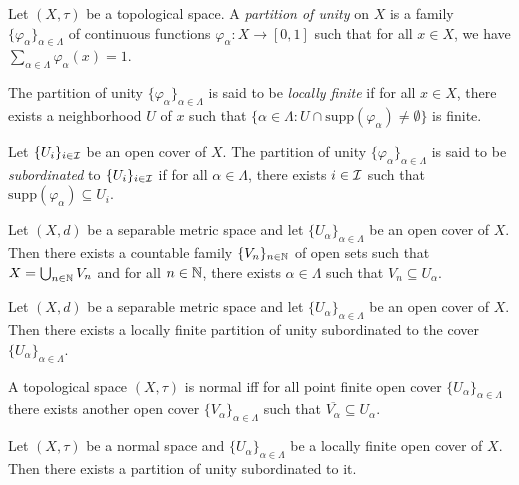 \documentclass[screen,single]{techreport}
\numberwithin{equation}{section}
\begin{document}
\begin{definition}\label{De:PartiOfUnity}
  Let $(X,\tau)$ be a topological space.
  A \emph{partition of unity} on $X$ is a family $\{ \varphi_\alpha \}_{\alpha \in \Lambda}$ of continuous functions $\varphi_\alpha : X \to [0,1]$ such that for all $x \in X$, we have $\sum_{\alpha \in \Lambda} \varphi_\alpha(x) = 1$.
  
  The partition of unity $\{ \varphi_\alpha\}_{\alpha \in \Lambda}$ is said to be \emph{locally finite} if for all $x \in X$, there exists a neighborhood $U$ of $x$ such that $\{ \alpha \in \Lambda : U \cap \mathrm{supp}(\varphi_\alpha) \neq \emptyset \}$ is finite.
  
  Let $\{U_i\}_{i \in \mathcal{I}}$ be an open cover of $X$.
  The partition of unity $\{ \varphi_{\alpha} \}_{\alpha \in \Lambda}$ is said to be \emph{subordinated} to $\{U_i\}_{i \in \mathcal{I}}$ if for all $\alpha \in \Lambda$, there exists $i \in \mathcal{I}$ such that $\mathrm{supp}(\varphi_\alpha) \subseteq U_i$.
\end{definition}

\begin{lemma}\label{Lem:SeparMetricImplyOpenCoverAdmitCountableRefine}
  Let $(X,d)$ be a separable metric space and let $\{U_\alpha\}_{\alpha \in \Lambda}$ be an open cover of $X$.
  Then there exists a countable family $\{V_n\}_{n \in \mathbb{N}}$ of open sets such that $X = \bigcup_{n \in \mathbb{N}} V_n$ and for all $n \in \mathbb{N}$, there exists $\alpha \in \Lambda$ such that $V_n \subseteq U_\alpha$.
\end{lemma}

\begin{theorem}\label{The:SeparMetricImplyLocFinPartiOfUnitySubord}
  Let $(X,d)$ be a separable metric space and let $\{U_\alpha\}_{\alpha \in \Lambda}$ be an open cover of $X$.
  Then there exists a locally finite partition of unity subordinated to the cover $\{U_\alpha\}_{\alpha \in \Lambda}$.
\end{theorem}

\begin{lemma}\label{Lem:NormalIffAnyPointFinCoverAdmitClosRefineCover}
  A topological space $(X,\tau)$ is normal iff for all point finite open cover $\{U_\alpha\}_{\alpha \in \Lambda}$ there exists another open cover $\{V_\alpha\}_{\alpha \in \Lambda}$ such that $\overline{V_\alpha} \subseteq U_\alpha$.
\end{lemma}

\begin{theorem}\label{The:NormalImplyLocFinCoverAdmitPartiOfUnity}
  Let $(X,\tau)$ be a normal space and $\{U_\alpha\}_{\alpha \in \Lambda}$ be a locally finite open cover of $X$.
  Then there exists a partition of unity subordinated to it.
\end{theorem}
\end{document}
